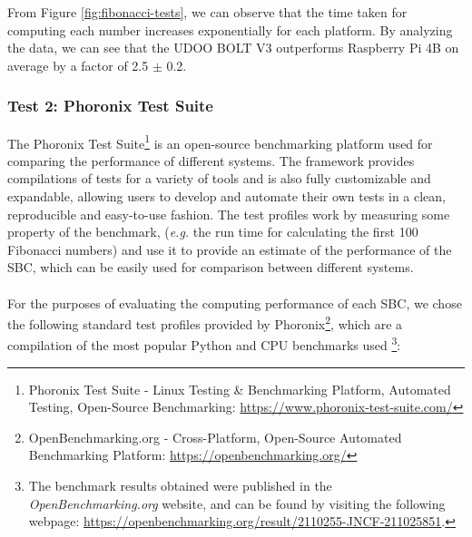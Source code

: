 From Figure \ref{fig:fibonacci-tests}, we can observe that the time taken for computing each number increases exponentially for each platform. By analyzing the data, we can see that the UDOO BOLT V3 outperforms Raspberry Pi 4B on average by a factor of 2.5 $\pm$ 0.2.

\subsubsection{Test 2: Phoronix Test Suite}

The Phoronix Test Suite\footnote{Phoronix Test Suite - Linux Testing \& Benchmarking Platform, Automated Testing, Open-Source Benchmarking: \url{https://www.phoronix-test-suite.com/}} is an open-source benchmarking platform used for comparing the performance of different systems. The framework provides compilations of tests for a variety of tools and is also fully customizable and expandable, allowing users to develop and automate their own tests in a clean, reproducible and easy-to-use fashion. The test profiles work by measuring some property of the benchmark, (\textit{e.g.} the run time for calculating the first 100 Fibonacci numbers) and use it to provide an estimate of the performance of the \acs{SBC}, which can be easily used for comparison between different systems. 

\paragraph{} For the purposes of evaluating the computing performance of each \acs{SBC}, we chose the following standard test profiles provided by Phoronix\footnote{OpenBenchmarking.org - Cross-Platform, Open-Source Automated Benchmarking Platform: \url{https://openbenchmarking.org/}}, which are a compilation of the most popular Python and CPU benchmarks used \footnote{The benchmark results obtained were published in the \textit{OpenBenchmarking.org} website, and can be found by visiting the following webpage: \url{https://openbenchmarking.org/result/2110255-JNCF-211025851}.}:

